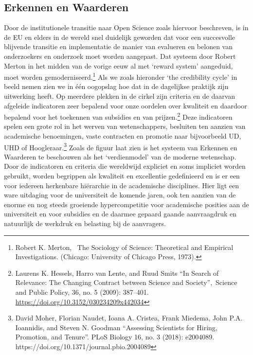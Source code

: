 \documentclass{jote-book}
\begin{document}
	\subsection{Erkennen en Waarderen}



	Door de institutionele transitie naar Open Science zoals hiervoor beschreven, is in de EU en elders in de wereld snel duidelijk geworden dat voor een succesvolle blijvende transitie en implementatie de manier van evalueren en belonen van onderzoekers en onderzoek moet worden aangepast. Dat systeem door Robert Merton in het midden van de vorige eeuw al met ‘reward system' aangeduid, moet worden gemoderniseerd.\footnote{Robert K. Merton,  The Sociology of Science: Theoretical and Empirical Investigations. (Chicago: University of Chicago Press, 1973).} Als we zoals hieronder ‘the credibility cycle' in beeld nemen zien we in één oogopslag hoe dat in de dagelijkse praktijk zijn uitwerking heeft. Op meerdere plekken in de cirkel zijn criteria en de daarvan afgeleide indicatoren zeer bepalend voor onze oordelen over kwaliteit en daardoor bepalend voor het toekennen van subsidies en van prijzen.\footnote{Laurens K. Hessels, Harro van Lente, and Ruud Smits “In Search of Relevance: The Changing Contract between Science and Society”, Science and Public Policy, 36, no. 5 (2009): 387--401. \href{https://doi.org/10.3152/030234209x442034}{https://doi.org/10.3152/030234209x442034}} Deze indicatoren spelen een grote rol in het werven van wetenschappers, besluiten ten aanzien van academische benoemingen, vaste contracten en promotie naar bijvoorbeeld UD, UHD of Hoogleraar.\footnote{David Moher, Florian Naudet, Ioana A. Cristea, Frank Miedema, John P.A. Ioannidis, and Steven N. Goodman “Assessing Scientists for Hiring, Promotion, and Tenure”. PLoS Biology 16, no. 3 (2018): e2004089. https://doi.org/10.1371/journal.pbio.2004089} Zoals de figuur laat zien is het systeem van Erkennen en Waarderen te beschouwen als het ‘verdienmodel' van de moderne wetenschap. Door de indicatoren en criteria die wereldwijd expliciet en soms impliciet worden gebruikt, worden begrippen als kwaliteit en excellentie gedefinieerd en is er een voor iedereen herkenbare hiërarchie in de academische disciplines. Hier ligt een ware uitdaging voor de universiteit de komende jaren, ook ten aanzien van de enorme en nog steeds groeiende hypercompetitie voor academische posities aan de universiteit en voor subsidies en de daarmee gepaard gaande aanvraagdruk en natuurlijk de werkdruk en belasting bij de aanvragers.
\end{document}
